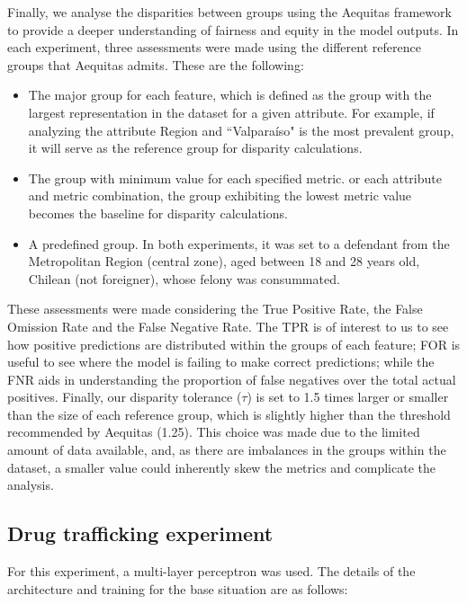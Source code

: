 \documentclass[twoside,11pt]{article}
\begin{document}
Finally, we analyse the disparities between groups using the Aequitas framework to provide a deeper understanding of fairness and equity in the model outputs.  In each experiment, three assessments were made using the different reference groups that Aequitas admits. These are the following: 

\begin{itemize}
    \item The major group for each feature, which is defined as the group with the largest representation in the dataset for a given attribute. For example, if analyzing the attribute Region and ``Valparaíso" is the most prevalent group, it will serve as the reference group for disparity calculations.  
    \item The group with minimum value for each specified metric. or each attribute and metric combination, the group exhibiting the lowest metric value becomes the baseline for disparity calculations. 
    \item A predefined group. In both experiments, it was set to a defendant from the Metropolitan Region (central zone), aged between 18 and 28 years old, Chilean (not foreigner), whose felony was consummated. 
\end{itemize}


These assessments were made considering the True Positive Rate, the False Omission Rate and the False Negative Rate. The TPR is of interest to us to see how positive predictions are distributed within the groups of each feature; FOR is useful to see where the model is failing to make correct predictions; while the FNR aids in understanding the proportion of false negatives over the total actual positives. Finally, our disparity tolerance ($\tau$) is set to 1.5 times larger or smaller than the size of each reference group, which is slightly higher than the threshold recommended by Aequitas (1.25). This choice was made due to the limited amount of data available, and, as there are imbalances in the groups within the dataset, a smaller value could inherently skew the metrics and complicate the analysis.


\subsection{Drug trafficking experiment}

For this experiment, a multi-layer perceptron was used. The details of the architecture and training for the base situation are as follows:
\end{document}
